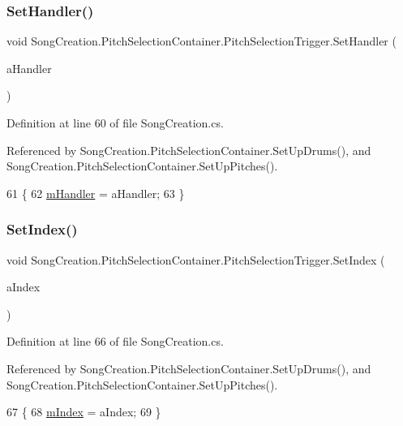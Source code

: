 \subsubsection{\texorpdfstring{Set\+Handler()}{SetHandler()}}
{\footnotesize\ttfamily void Song\+Creation.\+Pitch\+Selection\+Container.\+Pitch\+Selection\+Trigger.\+Set\+Handler (\begin{DoxyParamCaption}\item[{\hyperlink{class_song_creation_1_1_pitch_selection_container}{Pitch\+Selection\+Container}}]{a\+Handler }\end{DoxyParamCaption})}



Definition at line 60 of file Song\+Creation.\+cs.



Referenced by Song\+Creation.\+Pitch\+Selection\+Container.\+Set\+Up\+Drums(), and Song\+Creation.\+Pitch\+Selection\+Container.\+Set\+Up\+Pitches().


\begin{DoxyCode}
61             \{
62                 \hyperlink{group___s_c_handlers_gaad92d071482ccc179c9a40cada09785b}{mHandler} = aHandler;
63             \}
\end{DoxyCode}
\mbox{\label{group___s_c_handlers_ga1f01d4d64cc4697b0c403c007a014afa}} 
\subsubsection{\texorpdfstring{Set\+Index()}{SetIndex()}}
{\footnotesize\ttfamily void Song\+Creation.\+Pitch\+Selection\+Container.\+Pitch\+Selection\+Trigger.\+Set\+Index (\begin{DoxyParamCaption}\item[{int}]{a\+Index }\end{DoxyParamCaption})}



Definition at line 66 of file Song\+Creation.\+cs.



Referenced by Song\+Creation.\+Pitch\+Selection\+Container.\+Set\+Up\+Drums(), and Song\+Creation.\+Pitch\+Selection\+Container.\+Set\+Up\+Pitches().


\begin{DoxyCode}
67             \{
68                 \hyperlink{group___s_c_handlers_ga6fa7a0883292035fef62858a69044010}{mIndex} = aIndex;
69             \}
\end{DoxyCode}
\mbox{\label{group___s_c_handlers_ga906474015828cf26182e1f06f7094e00}} 
